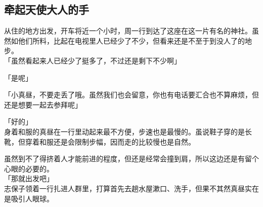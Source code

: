 \subsection{牵起天使大人的手}

从住的地方出发，开车将近一个小时，周一行到达了这座在这一片有名的神社。虽然如他们所料，比起在电视里人已经少了不少，但看来还是不至于到没人了的地步。\\

「虽然看起来人已经少了挺多了，不过还是剩下不少啊」

「是呢」

「小真昼，不要走丢了哦。虽然我们也会留意，你也有电话要汇合也不算麻烦，但还是想要一起去参拜呢」

「好的」\\

身着和服的真昼在一行里动起来最不方便，步速也是最慢的。虽说鞋子穿的是长靴，但穿着和服还是会限制步幅，因而走的比较慢也是自然。

虽然到不了得挤着人才能前进的程度，但还是经常会撞到肩，所以这边还是有留个心眼的必要的。\\

「那就出发吧」\\

志保子领着一行扎进人群里，打算首先去趟水屋漱口、洗手，但果不其然真昼实在是吸引人眼球。\\

